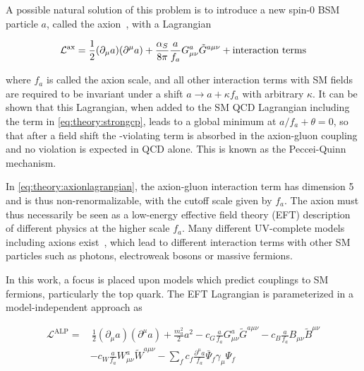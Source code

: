 A possible natural solution of this problem is to introduce a new spin-0 BSM particle $a$, called the axion~\cite{Weinberg:1977ma,Wilczek:1977pj}, with a Lagrangian~\cite{DiLuzio:2020wdo}

\begin{equation}
\label{eq:theory:axionlagrangian}
    \mathcal{L}^{\mathrm{ax}} = \frac{1}{2} (\partial_\mu a) (\partial^\mu a) + \frac{\alpha_S}{8 \pi} \frac{a}{f_a} G^{a}_{\mu \nu} \tilde{G}^{a \mu \nu} + \text{interaction terms}
\end{equation}

\noindent where $f_a$ is called the axion scale, and all other interaction terms with SM fields are required to be invariant under a shift $a \rightarrow a + \kappa f_a$ with arbitrary $\kappa$. It can be shown that this Lagrangian, when added to the SM QCD Lagrangian including the term in \cref{eq:theory:strongcp}, leads to a global minimum at $a/f_a + \theta = 0$, so that after a field shift the \CP-violating term is absorbed in the axion-gluon coupling and no \CP violation is expected in QCD alone. This is known as the Peccei-Quinn mechanism.

In \cref{eq:theory:axionlagrangian}, the axion-gluon interaction term has dimension 5 and is thus non-renormalizable, with the cutoff scale given by $f_a$. The axion must thus necessarily be seen as a low-energy effective field theory (EFT) description of different physics at the higher scale $f_a$. Many different UV-complete models including axions exist~\cite{DiLuzio:2020wdo,Kim:1979if,Shifman:1979if,Dine:1981rt,Zhitnitsky:1980tq}, which lead to different interaction terms with other SM particles such as photons, electroweak bosons or massive fermions.

In this work, a focus is placed upon models which predict couplings to SM fermions, particularly the top quark. The EFT Lagrangian is parameterized in a model-independent approach as~\cite{Georgi:1986df}

\begin{equation}
\begin{split}
\label{eq:theory:alplagrangian}
    \mathcal{L}^{\mathrm{ALP}} =& \, \frac{1}{2} (\partial_\mu a) (\partial^\mu a)
    + \frac{m_a^2}{2} a^2
    - c_G \frac{a}{f_a} G^{a}_{\mu \nu} \tilde{G}^{a \mu \nu}
    - c_B \frac{a}{f_a} B_{\mu \nu} \tilde{B}^{\mu \nu} \\
    & - c_W \frac{a}{f_a} W^{a}_{\mu \nu} \tilde{W}^{a \mu \nu}
    - \sum_f c_f \frac{\partial^\mu a}{f_a} \bar{\Psi}_f \gamma_\mu \Psi_f
\end{split}
\end{equation}

